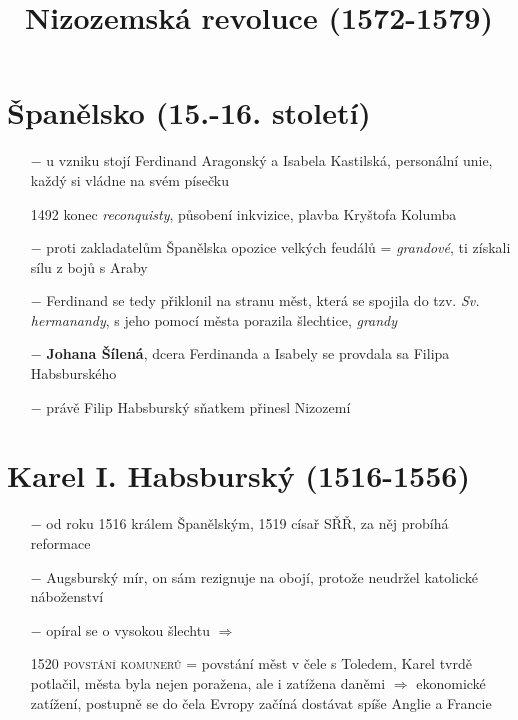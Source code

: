 \documentclass{article}
\title{\vspace{-2cm}Nizozemská revoluce (1572-1579)\vspace{-1.7cm}}
\date{}
\author{}
\begin{document}
\maketitle

\section*{Španělsko (15.-16. století)}

\begin{itemize}
    \vspace{-0.5em}
    \setlength\itemsep{0.15em}
    \item[$-$] u vzniku stojí Ferdinand Aragonský a Isabela Kastilská, personální unie, každý si vládne na svém písečku
    \item[1492] konec \textit{reconquisty}, působení inkvizice, plavba Kryštofa Kolumba
    \item[$-$] proti zakladatelům Španělska opozice velkých feudálů = \textit{grandové}, ti získali sílu z bojů s Araby
    \item[$-$] Ferdinand se tedy přiklonil na stranu měst, která se spojila do tzv. \textit{Sv. hermanandy}, s jeho pomocí města porazila šlechtice, \textit{grandy}
    \item[$-$] \textbf{Johana Šílená}, dcera Ferdinanda a Isabely se provdala sa Filipa Habsburského
    \item[$-$] právě Filip Habsburský sňatkem přinesl Nizozemí
\end{itemize}

\section*{Karel I. Habsburský (1516-1556)}
\begin{itemize}
    \vspace{-0.5em}
    \setlength\itemsep{0.15em}
    \item[$-$] od roku 1516 králem Španělským, 1519 císař SŘŘ, za něj probíhá reformace
    \item[$-$] Augsburský mír, on sám rezignuje na obojí, protože neudržel katolické náboženství
    \item[$-$] opíral se o vysokou šlechtu $\Rightarrow$
    \item[1520] \textsc{povstání komunerů} = povstání měst v čele s Toledem, Karel tvrdě potlačil, města byla nejen poražena, ale i zatížena daněmi $\Rightarrow$ ekonomické zatížení, postupně se do čela Evropy začíná dostávat spíše Anglie a Francie 
\end{itemize}
\end{document}
